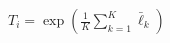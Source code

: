 \documentclass[border=3pt,varwidth=16cm]{standalone}
\begin{document}
$\displaystyle T_i = \exp\!\left(\frac{1}{K}\sum_{k=1}^{K}\bar{\ell}_k\right)$
\end{document}
